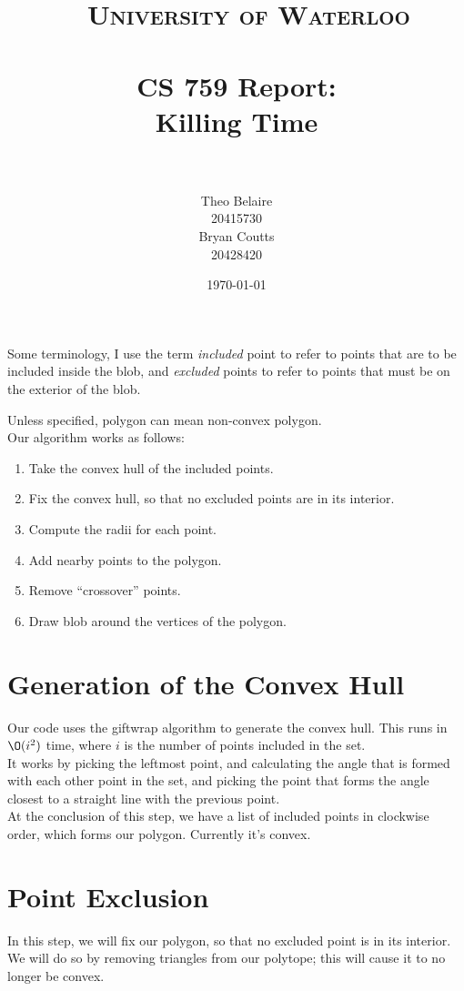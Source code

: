 \documentclass[paper=a4, fontsize=11pt]{scrartcl} %
\title{\
    \normalfont\normalsize
    \textsc{University of Waterloo} \\ [25pt] %
    \horrule{0.5pt} \\[0.4cm] %
    \huge CS 759 Report:\\
    Killing Time \\
    \horrule{2pt} \\[0.5cm] %
}
\author{Theo Belaire \\ 20415730 \\ Bryan Coutts \\ 20428420} %
\date{\normalsize\today} %
\numberwithin{equation}{section} %
\numberwithin{figure}{section} %
\numberwithin{table}{section} %
\begin{document}
\maketitle %


Some terminology, I use the term \textit{included} point to refer to points
that are to be included inside the blob, and \textit{excluded} points to refer
to points that must be on the exterior of the blob.

Unless specified, polygon can mean non-convex polygon. \\

Our algorithm works as follows:
\begin{enumerate}
\item Take the convex hull of the included points.
\item Fix the convex hull, so that no excluded points are in its interior.
\item Compute the radii for each point.
\item Add nearby points to the polygon. 
\item Remove ``crossover'' points.
\item Draw blob around the vertices of the polygon.
\end{enumerate}


\section{Generation of the Convex Hull}
Our code uses the giftwrap algorithm to generate the convex hull.
This runs in $\O(i^2)$ time, where $i$ is the number of points included in the
set. \\

It works by picking the leftmost point, and calculating the angle that is
formed with each other point in the set, and picking the point that forms
the angle closest to a straight line with the previous point. \\

At the conclusion of this step, we have a list of included points in clockwise
order, which forms our polygon.  Currently it's convex.

\section{Point Exclusion}
In this step, we will fix our polygon, so that no excluded point is in its
interior. We will do so by removing triangles from our polytope; this will cause
it to no longer be convex. \\
\end{document}
